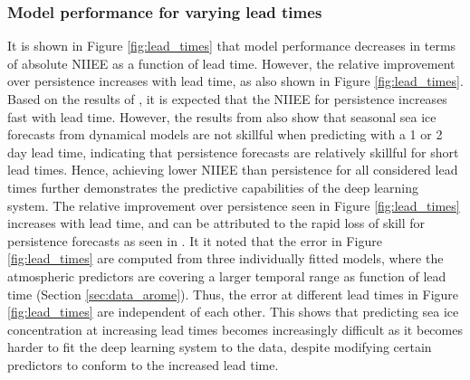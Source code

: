 \documentclass[../main/thesis]{subfiles}
\begin{document}
\subsubsection{Model performance for varying lead times}
\label{sec:discuss_perf_leadtimes}
It is shown in Figure \ref{fig:lead_times} that model performance decreases in terms of absolute NIIEE as a function of lead time. However, the relative improvement over persistence increases with lead time, as also shown in Figure \ref{fig:lead_times}. Based on the results of \citet{Zampieri2019}, it is expected that the NIIEE for persistence increases fast with lead time. However, the results from \citet{Zampieri2019} also show that seasonal sea ice forecasts from dynamical models are not skillful when predicting with a 1 or 2 day lead time, indicating that persistence forecasts are relatively skillful for short lead times. Hence, achieving lower NIIEE than persistence for all considered lead times further demonstrates the predictive capabilities of the deep learning system. The relative improvement over persistence seen in Figure \ref{fig:lead_times} increases with lead time, and can be attributed to the rapid loss of skill for persistence forecasts as seen in \citet{Zampieri2019}. It it noted that the error in Figure \ref{fig:lead_times} are computed from three individually fitted models, where the atmospheric predictors are covering a larger temporal range as function of lead time (Section \ref{sec:data_arome}). Thus, the error at different lead times in Figure \ref{fig:lead_times} are independent of each other. This shows that predicting sea ice concentration at increasing lead times becomes increasingly difficult as it becomes harder to fit the deep learning system to the data, despite modifying certain predictors to conform to the increased lead time.
\end{document}
